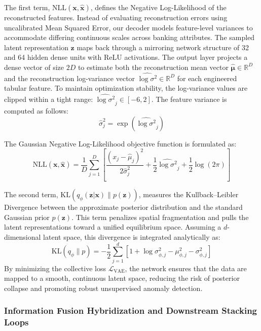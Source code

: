 The first term, $\text{NLL}(\mathbf{x}, \hat{\mathbf{x}})$, defines the Negative Log-Likelihood of the reconstructed features. Instead of evaluating reconstruction errors using uncalibrated Mean Squared Error, our decoder models feature-level variances to accommodate differing continuous scales across banking attributes. The sampled latent representation $\mathbf{z}$ maps back through a mirroring network structure of 32 and 64 hidden dense units with ReLU activations. The output layer projects a dense vector of size $2D$ to estimate both the reconstruction mean vector $\hat{\boldsymbol{\mu}} \in \mathbb{R}^D$ and the reconstruction log-variance vector $\widehat{\log \sigma^2} \in \mathbb{R}^D$ for each engineered tabular feature. To maintain optimization stability, the log-variance values are clipped within a tight range: $\widehat{\log \sigma^2}_j \in [-6, 2]$. The feature variance is computed as follows:
\begin{equation}\label{eq:7.10}
    \hat{\sigma}^2_j = \exp\!\left(\widehat{\log \sigma^2}_j\right)
\end{equation}

The Gaussian Negative Log-Likelihood objective function is formulated as:
\begin{equation}\label{eq:7.11}
    \text{NLL}(\mathbf{x}, \hat{\mathbf{x}}) = \frac{1}{D}\sum_{j=1}^{D}\left[\frac{(x_j - \hat{\mu}_j)^2}{2\hat{\sigma}^2_j} + \frac{1}{2}\widehat{\log \sigma^2}_j + \frac{1}{2}\log(2\pi)\right]
\end{equation}

The second term, $\text{KL}(q_\phi(\mathbf{z}|\mathbf{x}) \| p(\mathbf{z}))$, measures the Kullback--Leibler Divergence between the approximate posterior distribution and the standard Gaussian prior $p(\mathbf{z})$. This term penalizes spatial fragmentation and pulls the latent representations toward a unified equilibrium space. Assuming a $d$-dimensional latent space, this divergence is integrated analytically as:
\begin{equation}\label{eq:7.12}
    \text{KL}(q_\phi \| p) = -\frac{1}{2}\sum_{j=1}^{d}\left[1 + \log \sigma^2_{\phi,j} - \mu^2_{\phi,j} - \sigma^2_{\phi,j}\right]
\end{equation}
By minimizing the collective loss $\mathcal{L}_{\text{VAE}}$, the network ensures that the data are mapped to a smooth, continuous latent space, reducing the risk of posterior collapse and promoting robust unsupervised anomaly detection.

\subsubsection{Information Fusion Hybridization and Downstream Stacking Loops}

